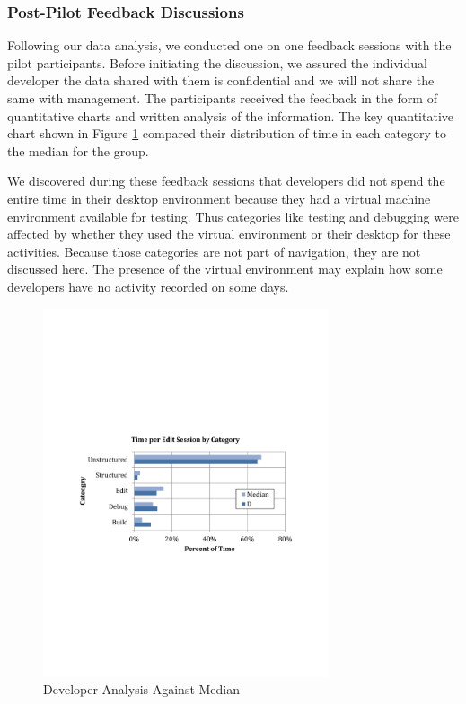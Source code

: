 \documentclass{sig-alternate}
\begin{document}
\subsubsection{Post-Pilot Feedback Discussions}


Following our data analysis, we conducted one on one feedback sessions with the pilot participants. Before initiating the discussion, we assured the individual developer the data shared with them is confidential and we will not share the same with management. The participants received the feedback in the form of quantitative charts and written analysis of the information.  The key quantitative chart shown in Figure \ref{fig:developercomparison} compared their distribution of time in each category to the median for the group.   

We discovered during these feedback sessions that developers did not spend the entire time in their desktop environment because they had a virtual machine environment available for testing. Thus categories like testing and debugging were affected by whether they used the virtual environment or their desktop for these activities.  Because those categories are not part of navigation, they are not discussed here. The presence of the virtual environment may explain how some developers have no activity recorded on some days.  

\begin{figure}
	\includegraphics[width=3.3in]{developerEmedian.pdf}
	\caption{Developer Analysis Against Median}
	\label{fig:developercomparison}
\end{figure}
\end{document}
